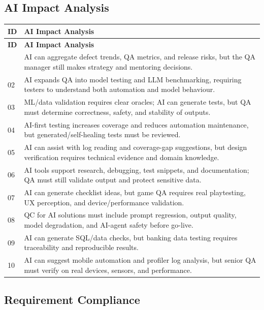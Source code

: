 \documentclass[12pt, a4paper]{article}
\begin{document}
\subsection{AI Impact Analysis}

\begin{longtable}{@{} C{0.7cm} L{13.3cm} @{}}
\toprule
{}
\textbf{ID} & \textbf{AI Impact Analysis} \\
\midrule
\endfirsthead
\toprule
{}
\textbf{ID} & \textbf{AI Impact Analysis} \\
\midrule
\endhead
\bottomrule
{} & AI can aggregate defect trends, QA metrics, and release risks, but the QA manager still makes strategy and mentoring decisions. \\
02 & AI expands QA into model testing and LLM benchmarking, requiring testers to understand both automation and model behaviour. \\
03 & ML/data validation requires clear oracles; AI can generate tests, but QA must determine correctness, safety, and stability of outputs. \\
04 & AI-first testing increases coverage and reduces automation maintenance, but generated/self-healing tests must be reviewed. \\
05 & AI can assist with log reading and coverage-gap suggestions, but design verification requires technical evidence and domain knowledge. \\
06 & AI tools support research, debugging, test snippets, and documentation; QA must still validate output and protect sensitive data. \\
07 & AI can generate checklist ideas, but game QA requires real playtesting, UX perception, and device/performance validation. \\
08 & QC for AI solutions must include prompt regression, output quality, model degradation, and AI-agent safety before go-live. \\
09 & AI can generate SQL/data checks, but banking data testing requires traceability and reproducible results. \\
10 & AI can suggest mobile automation and profiler log analysis, but senior QA must verify on real devices, sensors, and performance. \\
\bottomrule
\end{longtable}

\subsection{Requirement Compliance}
\end{document}
